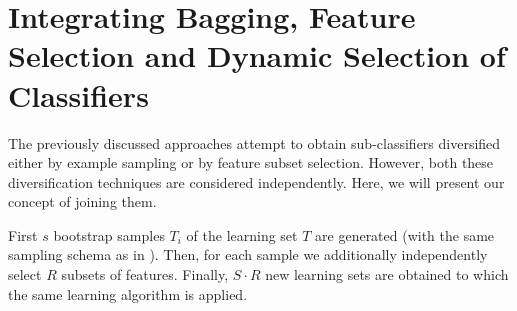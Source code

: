 \documentclass[runningheads]{llncs}
\begin{document}
\section{Integrating Bagging, Feature Selection and Dynamic Selection of Classifiers}

The previously discussed approaches attempt to obtain sub-classifiers
diversified either by example sampling or by feature subset selection.
However, both these diversification techniques are considered independently.
Here, we will present our concept of joining them.

First $s$ bootstrap samples $T_i$ of the learning set $T$ are generated
(with the same sampling schema as in \cite{Bre}). Then, for each sample we
additionally independently select $R$ subsets of features. Finally, $S \cdot
R$ new learning sets are obtained to which the same learning algorithm is
applied.
\end{document}
